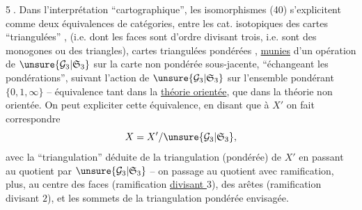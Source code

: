 \textcircled{5.} Dans l'interprétation ``cartographique'', les isomorphismes (40) s'explicitent comme deux équivalences de catégories, entre les cat. isotopiques des cartes ``triangulées'' , (i.e. dont  les faces sont d'ordre divisant trois, i.e. sont des monogones ou des triangles),  cartes  triangulées pondérées , \uline{munies} d'un
opération de $\unsure{\mathcal G_3|\mathfrak S_3}$ sur la carte non pondérée sous-jacente, ``échangeant les pondérations'', suivant l'action de $\unsure{\mathcal G_3|\mathfrak S_3}$ sur l'ensemble pondérant $\{0,1,\infty\}$ -- équivalence tant dans la \uline{théorie orientée}, que dans la théorie non orientée. On peut expliciter cette équivalence,  en disant que  à $X'$ on fait correspondre
\[
X=X'/\unsure{\mathcal G_3|\mathfrak S_3},
\]
avec la ``triangulation'' déduite de la triangulation (pondérée) de $X'$ en passant au quotient par $\unsure{\mathcal G_3|\mathfrak S_3}$ -- on  passage au quotient avec ramification,  plus, au centre des faces (ramification \uline{divisant $3$}), des arêtes (ramification divisant $2$), et les sommets de la triangulation pondérée envisagée.

